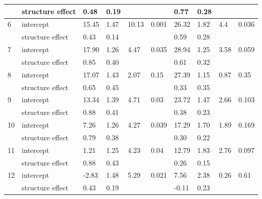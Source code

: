 \documentclass{article}
\begin{document}
\begin{table}[ht]
\begin{tabular}{|p{}|p{}|p{}p{}p{}p{}|p{}p{}p{}p{}|}
   & structure effect & 0.48 & 0.19 &  &  & 0.77 & 0.28 &  &  \\ 
   \hline
  6 & intercept & 15.45 & 1.47 & 10.13 & 0.001 & 26.32 & 1.82 & 4.4 & 0.036 \\ 
   & structure effect & 0.43 & 0.14 &  &  & 0.59 & 0.28 &  &  \\ 
   \hline
  7 & intercept & 17.90 & 1.26 & 4.47 & 0.035 & 28.94 & 1.25 & 3.58 & 0.059 \\ 
   & structure effect & 0.85 & 0.40 &  &  & 0.61 & 0.32 &  &  \\ 
   \hline
  8 & intercept & 17.07 & 1.43 & 2.07 & 0.15 & 27.39 & 1.15 & 0.87 & 0.35 \\ 
   & structure effect & 0.65 & 0.45 &  &  & 0.33 & 0.35 &  &  \\ 
   \hline
  9 & intercept & 13.34 & 1.39 & 4.71 & 0.03 & 23.72 & 1.47 & 2.66 & 0.103 \\ 
   & structure effect & 0.88 & 0.41 &  &  & 0.38 & 0.23 &  &  \\ 
   \hline
 10 & intercept & 7.26 & 1.26 & 4.27 & 0.039 & 17.29 & 1.70 & 1.89 & 0.169 \\ 
   & structure effect & 0.79 & 0.38 &  &  & 0.30 & 0.22 &  &  \\ 
   \hline
 11 & intercept & 1.21 & 1.25 & 4.23 & 0.04 & 12.79 & 1.83 & 2.76 & 0.097 \\ 
   & structure effect & 0.88 & 0.43 &  &  & 0.26 & 0.15 &  &  \\ 
   \hline
 12 & intercept & -2.83 & 1.48 & 5.29 & 0.021 & 7.56 & 2.38 & 0.26 & 0.61 \\ 
   & structure effect & 0.43 & 0.19 &  &  & -0.11 & 0.23 &  &  \\ 
   \hline
\end{tabular}
\endgroup
\end{table}\clearpage
  \clearpage
\end{document}
